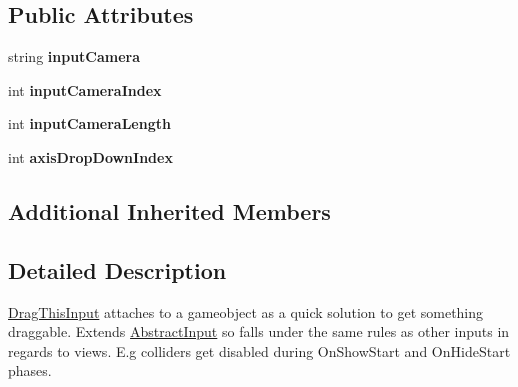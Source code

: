 \subsection*{Public Attributes}
\begin{DoxyCompactItemize}
\item 
\hypertarget{class_scaffolding_1_1_drag_this_input_a5b8cb43b5f174f58c7098642fda90dcc}{string {\bfseries input\+Camera}}\label{class_scaffolding_1_1_drag_this_input_a5b8cb43b5f174f58c7098642fda90dcc}

\item 
\hypertarget{class_scaffolding_1_1_drag_this_input_a6ce7f9342173a57e81b666fdd3162c8f}{int {\bfseries input\+Camera\+Index}}\label{class_scaffolding_1_1_drag_this_input_a6ce7f9342173a57e81b666fdd3162c8f}

\item 
\hypertarget{class_scaffolding_1_1_drag_this_input_a955fd31f5d266ed13258c695c323ef7e}{int {\bfseries input\+Camera\+Length}}\label{class_scaffolding_1_1_drag_this_input_a955fd31f5d266ed13258c695c323ef7e}

\item 
\hypertarget{class_scaffolding_1_1_drag_this_input_a923518138b1f4ab3842f44db144f6d22}{int {\bfseries axis\+Drop\+Down\+Index}}\label{class_scaffolding_1_1_drag_this_input_a923518138b1f4ab3842f44db144f6d22}

\end{DoxyCompactItemize}
\subsection*{Additional Inherited Members}


\subsection{Detailed Description}
\hyperlink{class_scaffolding_1_1_drag_this_input}{Drag\+This\+Input} attaches to a gameobject as a quick solution to get something draggable. Extends \hyperlink{class_scaffolding_1_1_abstract_input}{Abstract\+Input} so falls under the same rules as other inputs in regards to views. E.\+g colliders get disabled during On\+Show\+Start and On\+Hide\+Start phases. 



